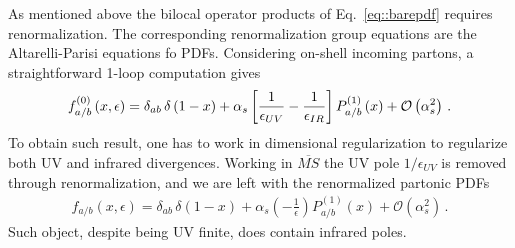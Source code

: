 %
As mentioned above the bilocal operator products of Eq.~\ref{eq::barepdf} requires renormalization.
The corresponding renormalization group equations are the Altarelli-Parisi equations fo PDFs.
Considering on-shell incoming partons, a straightforward 1-loop computation gives
\begin{align}
    \label{eq:1-loop_bare_partonic_pdf}
    f^{{(0)}}_{a/b}\left(x,\epsilon\right) = \delta_{ab}\,\delta\left(1-x\right)
    + \alpha_s\left[\frac{1}{\epsilon_{UV}}-\frac{1}{\epsilon_{IR}}\right] P_{a/b}^{(1)}\left(x\right)
    + \mathcal{O}\left(\alpha_s^2\right)\,.
\end{align}
To obtain such result, one has to work in dimensional regularization to regularize both UV and infrared
divergences. 
Working in $\overline{MS}$ the UV pole $1/\epsilon_{UV}$ is removed through renormalization,
and we are left with the renormalized partonic PDFs
\begin{align}
    \label{eq:1-loop_renormalized_partonic_pdf}
    f_{a/b}\left(x,\epsilon\right) = \delta_{ab}\,\delta\left(1-x\right)
    + \alpha_s\left(-\frac{1}{\epsilon}\right) P_{a/b}^{(1)}\left(x\right)
    + \mathcal{O}\left(\alpha_s^2\right)\,.
\end{align}
Such object, despite being UV finite, does contain 
infrared poles.

